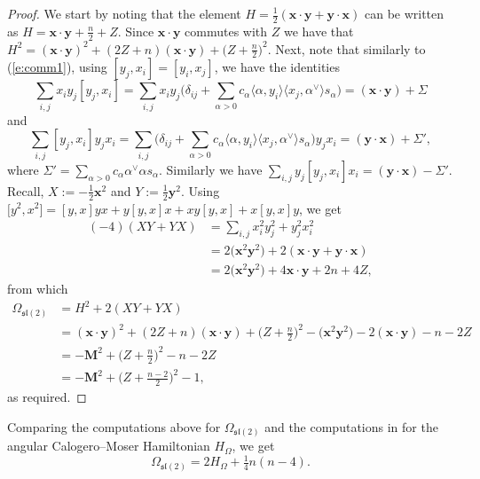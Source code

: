 \documentclass[10pt,a4paper]{amsart}
\numberwithin{equation}{section}
\newcommand{\fl}{\mathfrak{l}}
\newcommand{\fs}{\mathfrak{s}}
\newcommand{\bx}{\mathbf{x}}
\newcommand{\by}{\mathbf{y}}
\newcommand{\bM}{\mathbf{M}}
\begin{document}
\begin{proof}
We start by noting that the element $H =\tfrac{1}{2}(\bx\cdot\by + \by\cdot\bx)$ can be written as
$H = \bx\cdot\by + \tfrac{n}{2} +Z$.
Since $\bx\cdot\by$ commutes with $Z$ we have that $H^2 = (\bx\cdot\by)^2 + (2Z+n)(\bx\cdot\by) + \big(Z+\tfrac{n}{2}\big)^2$. Next, note that similarly to
(\ref{e:comm1}), using $[y_j,x_i]=[y_i,x_j]$, we have the identities
\begin{equation*}
\sum_{i,j} x_iy_j[y_j,x_i] = \sum_{i,j}x_iy_j\bigg(\delta_{ij} + \sum_{\alpha>0}c_\alpha \langle \alpha,y_i\rangle\langle x_j,\alpha^\vee \rangle s_\alpha\bigg)
= (\bx\cdot\by) + \Sigma
\end{equation*}
and
\begin{equation*}
\sum_{i,j} [y_j,x_i]y_jx_i= \sum_{i,j}\bigg(\delta_{ij} + \sum_{\alpha>0}c_\alpha \langle \alpha,y_i\rangle\langle x_j,\alpha^\vee \rangle s_\alpha\bigg)y_jx_i
= (\by\cdot\bx) + \Sigma',
\end{equation*}
where $\Sigma'= \sum_{\alpha>0}c_\alpha \alpha^\vee\alpha s_\alpha$. Similarly we have $\sum_{i,j} y_j[y_j,x_i]x_i = (\by\cdot\bx) - \Sigma'$. Recall, $X:= -\tfrac{1}{2}\bx^2$ and $Y:=\tfrac{1}{2} \by^2$. Using
$\big[y^2,x^2\big] = [y,x]yx+y[y,x]x + xy[y,x] + x[y,x]y$, we get
\begin{align*}
(-4)(XY + YX) &= \sum_{i,j} x_i^2y_j^2 + y_j^2x_i^2\\
&= 2\big(\bx^2\by^2\big) + 2(\bx\cdot\by + \by\cdot\bx)\\
&= 2\big(\bx^2\by^2\big) + 4\bx\cdot\by +2n + 4Z,
\end{align*}
from which
\begin{align*}
\Omega_{\fs\fl(2)} &= H^2 + 2(XY + YX) \\
&= (\bx\cdot\by)^2 + (2Z+n)(\bx\cdot\by) + \big(Z+\tfrac{n}{2}\big)^2 - \big(\bx^2\by^2\big) - 2(\bx\cdot\by) -n -2Z \\
&= -\bM^2 + \big(Z + \tfrac{n}{2}\big)^2 -n -2Z\\
&= -\bM^2 + \big(Z + \tfrac{n-2}{2}\big)^2 - 1,
\end{align*}
as required.
\end{proof}

\begin{Remark}\label{r:AngHamiltonian}
Comparing the computations above for $\Omega_{\fs\fl(2)}$ and the computations in \cite{FH15} for the angular Calogero--Moser Hamiltonian $H_\Omega$, we get
\[
\Omega_{\fs\fl(2)} = 2H_\Omega + \tfrac{1}{4}n(n-4).
\]
\end{Remark}
\end{document}
